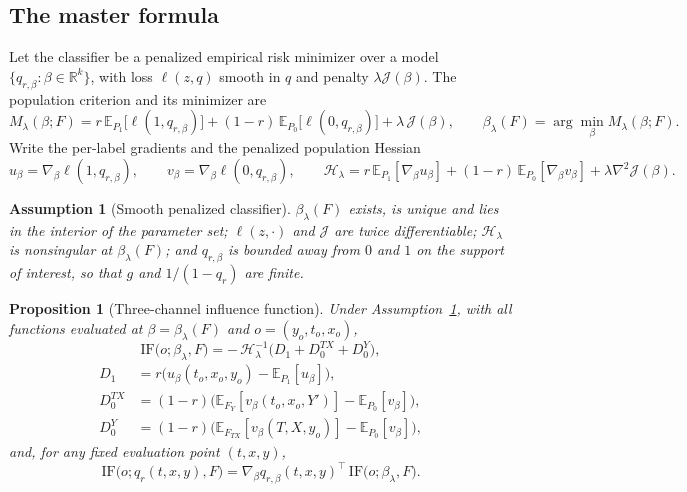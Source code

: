 \documentclass[11pt]{article}
\newtheorem{proposition}{Proposition}
\newtheorem*{assumption}{Assumption}
\newcommand{\Eb}{\mathbb{E}}
\newcommand{\IF}{\mathrm{IF}}
\newcommand{\Hb}{\mathcal{H}}
\begin{document}
\subsection{The master formula}
\label{sec:if-qr-master}

Let the classifier be a penalized empirical risk minimizer over a model
$\{q_{r,\beta}:\beta\in\mathbb{R}^k\}$, with loss $\ell(z,q)$ smooth in $q$ and
penalty $\lambda\mathcal{J}(\beta)$. The population criterion and its minimizer are
\begin{equation}
M_\lambda(\beta;F)
= r\,\Eb_{P_1}\big[\ell(1,q_{r,\beta})\big]
+ (1-r)\,\Eb_{P_0}\big[\ell(0,q_{r,\beta})\big]
+ \lambda\,\mathcal{J}(\beta),
\qquad
\beta_\lambda(F)=\arg\min_\beta M_\lambda(\beta;F).
\label{eq:pop-criterion}
\end{equation}
Write the per-label gradients and the penalized population Hessian
\[
u_\beta=\nabla_\beta\ell(1,q_{r,\beta}),\qquad
v_\beta=\nabla_\beta\ell(0,q_{r,\beta}),\qquad
\Hb_\lambda= r\,\Eb_{P_1}[\nabla_\beta u_\beta]+(1-r)\,\Eb_{P_0}[\nabla_\beta v_\beta]+\lambda\nabla^2\mathcal{J}(\beta).
\]

\begin{assumption}[Smooth penalized classifier]
\label{as:smooth}
$\beta_\lambda(F)$ exists, is unique and lies in the interior of the parameter set;
$\ell(z,\cdot)$ and $\mathcal{J}$ are twice differentiable; $\Hb_\lambda$ is
nonsingular at $\beta_\lambda(F)$; and $q_{r,\beta}$ is bounded away from $0$ and $1$
on the support of interest, so that $g$ and $1/(1-q_r)$ are finite.
\end{assumption}

\begin{proposition}[Three-channel influence function]
\label{prop:master}
Under Assumption~\ref{as:smooth}, with all functions evaluated at
$\beta=\beta_\lambda(F)$ and $o=(y_o,t_o,x_o)$,
\begin{equation}
\IF\big(o;\beta_\lambda,F\big) = -\,\Hb_\lambda^{-1}\big(D_1+D_0^{TX}+D_0^{Y}\big),
\label{eq:master}
\end{equation}
\begin{equation}
\begin{aligned}
D_1 &= r\big( u_\beta(t_o,x_o,y_o) - \Eb_{P_1}[u_\beta] \big),\\
D_0^{TX} &= (1-r)\big( \Eb_{F_Y}[v_\beta(t_o,x_o,Y')] - \Eb_{P_0}[v_\beta] \big),\\
D_0^{Y} &= (1-r)\big( \Eb_{F_{TX}}[v_\beta(T,X,y_o)] - \Eb_{P_0}[v_\beta] \big),
\end{aligned}
\label{eq:channels}
\end{equation}
and, for any fixed evaluation point $(t,x,y)$,
\begin{equation}
\IF\big(o;q_r(t,x,y),F\big) = \nabla_\beta q_{r,\beta}(t,x,y)^\top\,\IF\big(o;\beta_\lambda,F\big).
\label{eq:if-qr-chain}
\end{equation}
\end{proposition}
\end{document}
